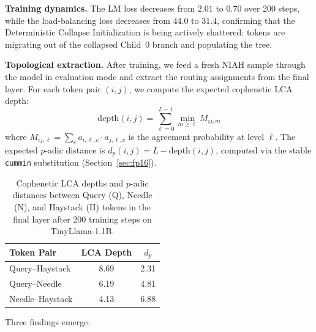 \documentclass[11pt,a4paper]{article}
\begin{document}
\textbf{Training dynamics.} The LM loss decreases from $2.01$ to $0.70$ over 200 steps, while the load-balancing loss decreases from $44.0$ to $31.4$, confirming that the Deterministic Collapse Initialization is being actively shattered: tokens are migrating out of the collapsed Child~0 branch and populating the tree.

\textbf{Topological extraction.} After training, we feed a fresh NIAH sample through the model in evaluation mode and extract the routing assignments from the final layer. For each token pair $(i, j)$, we compute the expected cophenetic LCA depth:
\begin{equation}
    \text{depth}(i, j) = \sum_{\ell=0}^{L-1} \min_{m \geq \ell} M_{ij,m}
\end{equation}
where $M_{ij,\ell} = \sum_c a_{i,\ell,c} \cdot a_{j,\ell,c}$ is the agreement probability at level $\ell$. The expected $p$-adic distance is $d_p(i,j) = L - \text{depth}(i,j)$, computed via the stable \texttt{cummin} substitution (Section~\ref{sec:fp16}).

\begin{table}[h]
\centering
\caption{Cophenetic LCA depths and $p$-adic distances between Query (Q), Needle (N), and Haystack (H) tokens in the final layer after 200 training steps on TinyLlama-1.1B.}
\label{tab:niah}
\begin{tabular}{@{}lcc@{}}
\toprule
Token Pair & LCA Depth & $d_p$ \\
\midrule
Query--Haystack  & 8.69 & 2.31 \\
Query--Needle    & 6.19 & 4.81 \\
Needle--Haystack & 4.13 & 6.88 \\
\bottomrule
\end{tabular}
\end{table}

Three findings emerge:
\end{document}
